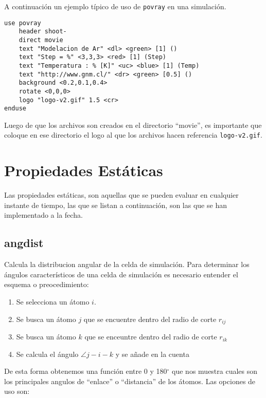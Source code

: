 A continuaci\'on un ejemplo t\'ipico de uso de \verb|povray| en una simulaci\'on.

\begin{verbatim}
use povray
    header shoot-
    direct movie
    text "Modelacion de Ar" <dl> <green> [1] ()
    text "Step = %" <3,3,3> <red> [1] (Step)
    text "Temperatura : % [K]" <uc> <blue> [1] (Temp)
    text "http://www.gnm.cl/" <dr> <green> [0.5] ()
    background <0.2,0.1,0.4>
    rotate <0,0,0>
    logo "logo-v2.gif" 1.5 <cr>
enduse
\end{verbatim}

Luego de que los archivos son creados en el directorio ``movie'', es importante que coloque en ese directorio el logo al que los archivos hacen referencia \verb|logo-v2.gif|.

\section{Propiedades Est\'aticas}
Las propiedades est\'aticas, son aquellas que se pueden evaluar en cualquier instante de tiempo, las que se listan a continuaci\'on, son las que se han implementado a la fecha.
\subsection{angdist}
Calcula la distribucion angular de la celda de simulaci\'on. Para determinar los \'angulos caracter\'isticos de una celda de simulaci\'on es necesario entender el esquema o preocedimiento:
\begin{enumerate}
 \item Se selecciona un \'atomo $i$.
 \item Se busca un \'atomo $j$ que se encuentre dentro del radio de corte $r_{ij}$
 \item Se busca un \'atomo $k$ que se enceuntre dentro del radio de corte $r_{ik}$
 \item Se calcula el \'angulo  $\angle j-i-k$ y se a\~nade en la cuenta
\end{enumerate}

De esta forma obtenemos una funci\'on entre 0 y 180$^\circ$ que nos muestra cuales son los principales angulos de ``enlace'' o ``distancia'' de los \'atomos. Las opciones de uso son:


